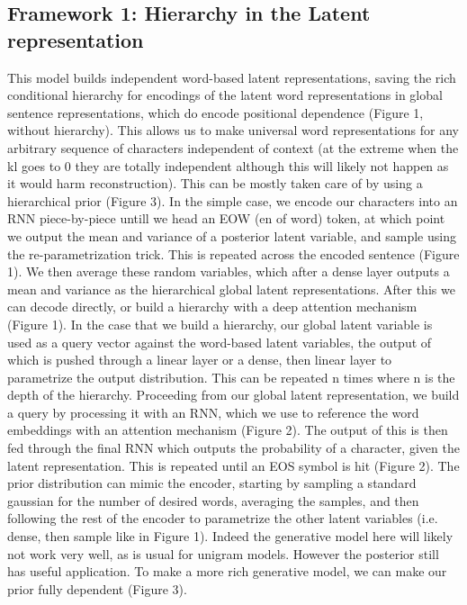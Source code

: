 \documentclass[journal, 12pt, draftcls, onecolumn]{IEEEtran}
\begin{document}
\subsection{Framework 1: Hierarchy in the Latent representation}
This model builds independent word-based latent representations, saving the rich conditional hierarchy for encodings of the latent word representations in global sentence representations, which do encode positional dependence (Figure 1, without hierarchy). This allows us to make universal word representations for any arbitrary sequence of characters independent of context (at the extreme when the kl goes to 0 they are totally independent although this will likely not happen as it would harm reconstruction). This can be mostly taken care of by using a hierarchical prior (Figure 3).
In the simple case, we encode our characters into an RNN piece-by-piece untill we head an EOW (en of word) token, at which point we output the mean and variance of a posterior latent variable, and sample using the re-parametrization trick. This is repeated across the encoded sentence (Figure 1). We then average these random variables, which after a dense layer outputs a mean and variance as the hierarchical global latent representations. After this we can decode directly, or build a hierarchy with a deep attention mechanism (Figure 1). In the case that we build a hierarchy, our global latent variable is used as a query vector against the word-based latent variables, the output of which is pushed through a linear layer or a dense, then linear layer to parametrize the output distribution. This can be repeated n times where n is the depth of the hierarchy. Proceeding from our global latent representation, we build a query by processing it with an RNN, which we use to reference the word embeddings with an attention mechanism (Figure 2). The output of this is then fed through the final RNN which outputs the probability of a character, given the latent representation. This is repeated until an EOS symbol is hit (Figure 2). The prior distribution can mimic the encoder, starting by sampling a standard gaussian for the number of desired words, averaging the samples, and then following the rest of the encoder to parametrize the other latent variables (i.e. dense, then sample like in Figure 1). Indeed the generative model here will likely not work very well, as is usual for unigram models. However the posterior still has useful application. To make a more rich generative model, we can make our prior fully dependent (Figure 3).
\end{document}
